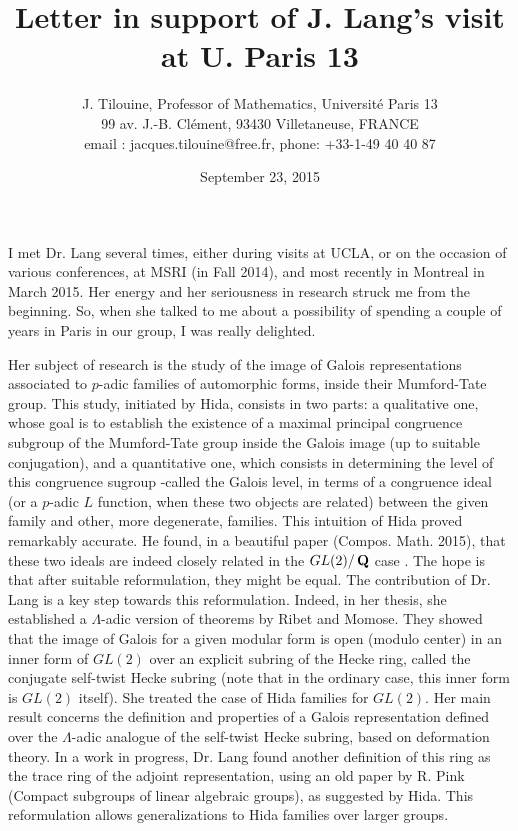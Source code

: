 \documentclass[12pt]{amsart}
\title{Letter in support of  J. Lang's visit at U. Paris 13}
\author{J. Tilouine, Professor of Mathematics, Universit\'e Paris 13\\ 99 av. J.-B. Cl\'ement, 93430 Villetaneuse, FRANCE\\ email : \MakeLowercase{jacques.tilouine@free.fr}, phone: +33-1-49 40 40 87}
\date{September 23, 2015}
\theoremstyle{definition}
\theoremstyle{definition}
\theoremstyle{definition}
\theoremstyle{definition}
\theoremstyle{definition}
\begin{document}
\maketitle

\vskip 5mm

I met Dr. Lang several times, either during visits at UCLA, or on the occasion of various conferences, at MSRI (in Fall 2014), 
and most recently in Montreal in March 2015. Her energy and her seriousness in research struck me from the beginning. 
So, when she talked to me about a possibility of spending a couple of years in Paris in our group, I was really delighted.

Her subject of research is the study of the image of Galois representations associated to $p$-adic families of automorphic forms,
 inside their Mumford-Tate group. This study, initiated by Hida, consists in two parts: a qualitative one, whose goal is to establish 
the existence of a maximal principal congruence subgroup of the Mumford-Tate group inside the Galois image (up to suitable conjugation), 
and a quantitative one, which consists in determining the level of this congruence sugroup 
-called the Galois level, in terms of a congruence ideal (or a $p$-adic $L$ function, when these two objects are related) 
between the given family and other, more degenerate, families. 
This intuition of Hida proved remarkably accurate. He found,  in a beautiful paper (Compos. Math. 2015), 
that these two ideals are indeed closely related in the $GL(2)/\operatorname{\mathbf{Q}}$ case . The hope is that after suitable reformulation, they might be equal. 
The contribution of Dr. Lang is a key step towards this reformulation. Indeed, in her thesis, she established
 a $\Lambda$-adic version of theorems by  Ribet and Momose. They showed that the image of Galois for  a given modular form
 is open (modulo center) in an inner form of $GL(2)$ 
over an explicit subring of the Hecke ring, called the conjugate self-twist Hecke subring (note that in the ordinary case, this inner form is 
$GL(2)$ itself). She treated the case of 
Hida families for $GL(2)$. Her main result concerns the definition and properties 
of a Galois representation defined over the $\Lambda$-adic analogue of the self-twist Hecke subring,
based on deformation theory. In a work in progress, Dr. Lang found another definition of this ring 
as the trace ring of the adjoint representation,
using an old paper by R. Pink (Compact subgroups of linear algebraic groups), as suggested  by Hida.  
This reformulation allows generalizations to Hida families over larger groups. 
\end{document}
